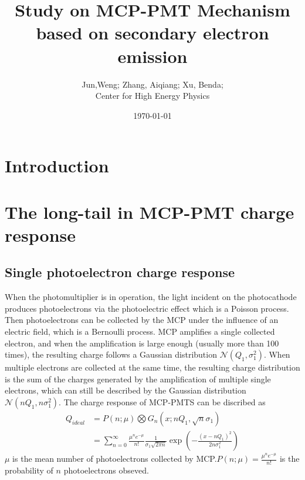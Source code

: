 \documentclass{article}
\title{Study on MCP-PMT Mechanism based on secondary electron emission}
\author{Jun,Weng; Zhang, Aiqiang; Xu, Benda; \\ Center for High Energy Physics}
\date{\today}
\begin{document}
\maketitle
\section{Introduction}\label{sec:Introduction}
\section{The long-tail in MCP-PMT charge response }\label{sec:long-tail}
\subsection{Single photoelectron charge response}\label{subsec:statistical}
When the photomultiplier is in operation, the light incident on the photocathode produces photoelectrons via the photoelectric effect
which is a Poisson process. Then photoelectrons can be collected by the MCP under the influence of an electric field, which is a Bernoulli process.
MCP amplifies a single collected  electron, and when the amplification is large enough (usually more than 100 times),
the resulting charge follows a Gaussian distribution $\mathcal{N} (Q_1, \sigma_1^2)$. When multiple electrons are collected at the same time, the resulting charge
distribution is the sum of the charges generated by the amplification of multiple single electrons,
which can still be described by the Gaussian distribution $\mathcal{N} (nQ_1, n\sigma_1^2)$.
The charge response of MCP-PMTS can be discribed as ~\cite{1994Absolute}
\begin{equation}
    \begin{aligned}
        Q_{ideal} & = P(n;\mu)\bigotimes G_n(x;nQ_1,\sqrt{n}\sigma_1)                                                                      \\
                  & =\sum_{n = 0}^{\infty}\frac{\mu^n e^{-\mu}}{n!}\frac{1}{\sigma_1\sqrt{2\pi n}}\exp(-\frac{{(x-nQ_1)}^2}{2n\sigma_1^2})
    \end{aligned}
    \label{eq:sreal}
\end{equation}
$\mu$ is the mean number of photoelectrons collected by MCP.\@ $P(n;\mu) = \frac{\mu^n e^{-\mu}}{n!}$ is the probability of $n$ photoelectrons obseved.
\end{document}
